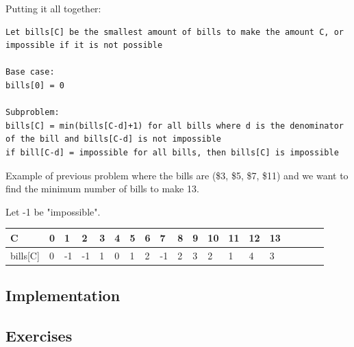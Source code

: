 \documentclass[11pt,oneside]{book}
\begin{document}
Putting it all together:

\begin{lstlisting}
Let bills[C] be the smallest amount of bills to make the amount C, or impossible if it is not possible

Base case:
bills[0] = 0

Subproblem:
bills[C] = min(bills[C-d]+1) for all bills where d is the denominator of the bill and bills[C-d] is not impossible
if bill[C-d] = impossible for all bills, then bills[C] is impossible
\end{lstlisting}

Example of previous problem where the bills are (\$3, \$5, \$7, \$11) and we want to find the minimum number of bills to make 13.

Let -1 be "impossible".

\vspace{10pt} \begin{tabular}{|l|l|l|l|l|l|l|l|l|l|l|l|l|l|l|l|l|l|l}\hline


  C &
  0 &
  1 &
  2 &
  3 &
  4 &
  5 &
  6 &
  7 &
  8 &
  9 &
  10 &
  11 &
  12 &
  13\\
\hline


  bills[C] &
  0 &
  -1 &
  -1 &
  1 &
  0 &
  1 &
  2 &
  -1 &
  2 &
  3 &
  2 &
  1 &
  4 &
  3\\

\hline\end{tabular}

\subsection{Implementation}

\subsection{Exercises}
\end{document}
